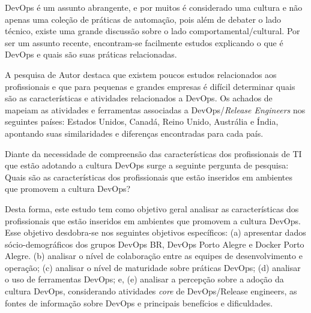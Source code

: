 \documentclass[twoside,english,brazilian]{UNISINOSartigo}
\begin{document}

DevOps é um assunto abrangente, e por muitos é considerado uma cultura e não apenas uma coleção de práticas de automação, pois além de debater o lado técnico, existe uma grande discussão sobre o lado comportamental/cultural. Por ser um assunto recente, encontram-se facilmente estudos explicando o que é DevOps e quais são suas práticas relacionadas. 


A pesquisa de Autor  destaca que existem poucos estudos relacionados aos profissionais e que para pequenas e grandes empresas é difícil determinar quais são as características e atividades relacionados a DevOps. Os achados de  mapeiam as atividades e ferramentas associadas a DevOps/\textit{Release Engineers} nos seguintes países: Estados Unidos, Canadá, Reino Unido, Austrália e Índia, apontando suas similaridades e diferenças encontradas para cada país.

Diante da necessidade de compreensão das características dos profissionais de TI que estão adotando a cultura DevOps surge a seguinte pergunta de pesquisa: Quais são as características dos profissionais que estão inseridos em ambientes que promovem a cultura DevOps?

Desta forma, este estudo tem como objetivo geral analisar as características dos profissionais que estão inseridos em ambientes que promovem a cultura DevOps. Esse objetivo desdobra-se nos seguintes objetivos específicos: (a) apresentar dados sócio-demográficos dos grupos DevOps BR, DevOps Porto Alegre e Docker Porto Alegre. (b) analisar o nível de colaboração entre as equipes de desenvolvimento e operação; (c) analisar o nível de maturidade sobre práticas DevOps; (d) analisar o uso de ferramentas DevOps; e, (e) analisar a percepção sobre a adoção da cultura DevOps, considerando atividades \textit{core} de DevOps/Release engineers, as fontes de informação sobre DevOps e principais benefícios e dificuldades.
\end{document}
